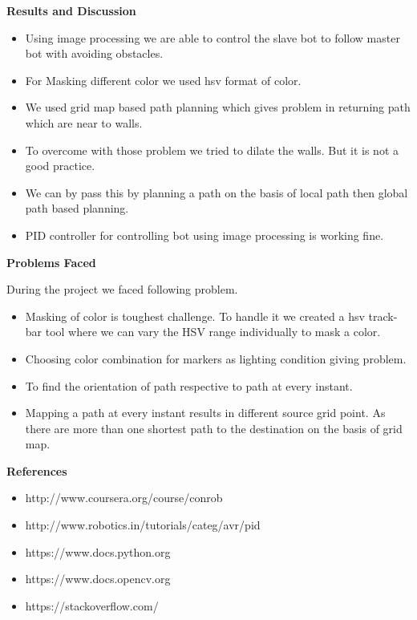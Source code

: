 \documentclass[report]{res}
\begin{document}
	\pagebreak
	
	
	\begin{center}
		\textbf{\huge Results and Discussion} \\
	\end{center}
	
	\begin{itemize}
	\item Using image processing we are able to control the slave bot to follow master bot with avoiding obstacles.
	\item For Masking different color we used hsv format of color. 
	\item We used grid map based path planning which gives problem in returning path which are near to walls. 
	\item To overcome with those problem we tried to dilate the walls. But it is not a good practice. 
	\item We can by pass this by planning a path on the basis of local path then global path based planning. 
	\item PID controller for controlling bot using image processing is working fine. 
	\end{itemize}

	\pagebreak


	\begin{center}
		\textbf{\huge Problems Faced} \\
	\end{center}

	During the project we faced following problem.

	\begin{itemize}

		\item Masking of color is toughest challenge. To handle it we created a hsv track-bar tool where we can vary the HSV range individually to mask a color.
		\item Choosing color combination for markers as lighting condition giving problem.
		\item To find the orientation of path respective to path at every  instant.
		\item Mapping a path at every instant results in different source grid point. As there are more than one shortest path to the destination on the basis of grid map. 
		
	\end{itemize}
	
	\pagebreak
	
	
	\begin{center}
		\textbf{\huge References} \\
	\end{center}
	
	\begin{itemize}
	
		\item http://www.coursera.org/course/conrob
		\item http://www.robotics.in/tutorials/categ/avr/pid
		\item https://www.docs.python.org
		\item https://www.docs.opencv.org
		\item https://stackoverflow.com/
	
	\end{itemize}
	
\end{document}
